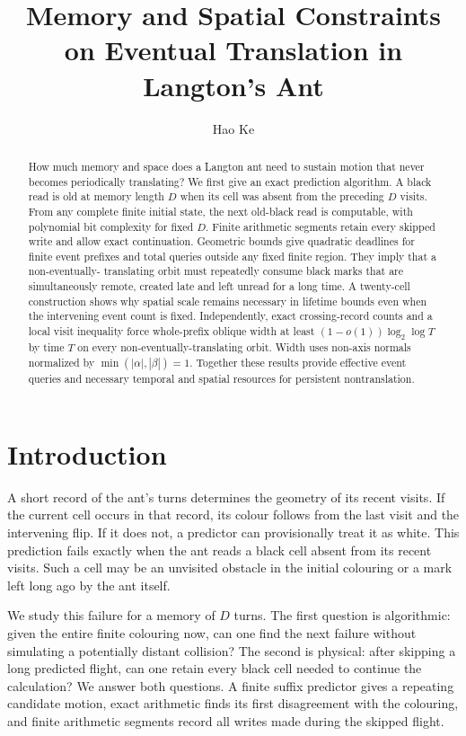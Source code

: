 \documentclass[
  11pt,
]{article}
\title{Memory and Spatial Constraints on Eventual Translation in Langton's Ant}
\author{Hao Ke}
\date{}
\begin{document}
\maketitle
\begin{abstract}
How much memory and space does a Langton ant need to sustain motion that
never becomes periodically translating? We first give an exact prediction
algorithm. A black read is old at memory length $D$ when its cell was absent
from the preceding $D$ visits. From any complete finite initial state, the next
old-black read is computable, with polynomial bit complexity for fixed $D$.
Finite arithmetic segments retain every skipped write and allow exact continuation.
Geometric bounds give quadratic deadlines for finite event prefixes and total
queries outside any fixed finite region. They imply that a non-eventually-
translating orbit must repeatedly consume black marks that are simultaneously
remote, created late and left unread for a long time. A twenty-cell construction
shows why spatial scale remains necessary in lifetime bounds even when the
intervening event count is fixed. Independently, exact crossing-record counts
and a local visit inequality force whole-prefix oblique width at least
$(1-o(1))\log_2\log T$ by time $T$ on every non-eventually-translating orbit.
Width uses non-axis normals normalized by $\min(|\alpha|,|\beta|)=1$.
Together these results provide effective event queries and necessary temporal
and spatial resources for persistent nontranslation.
\end{abstract}

\section{Introduction}\label{introduction}
A short record of the ant's turns determines the geometry of its recent
visits. If the current cell occurs in that record, its colour follows from
the last visit and the intervening flip. If it does not, a predictor can
provisionally treat it as white. This prediction fails exactly when the ant
reads a black cell absent from its recent visits. Such a cell may be an
unvisited obstacle in the initial colouring or a mark left long ago by the
ant itself.

We study this failure for a memory of $D$ turns. The first question is
algorithmic: given the entire finite colouring now, can one find the next
failure without simulating a potentially distant collision? The second is
physical: after skipping a long predicted flight, can one retain every black
cell needed to continue the calculation? We answer both questions. A finite
suffix predictor gives a repeating candidate motion, exact arithmetic finds
its first disagreement with the colouring, and finite arithmetic segments
record all writes made during the skipped flight.
\end{document}
